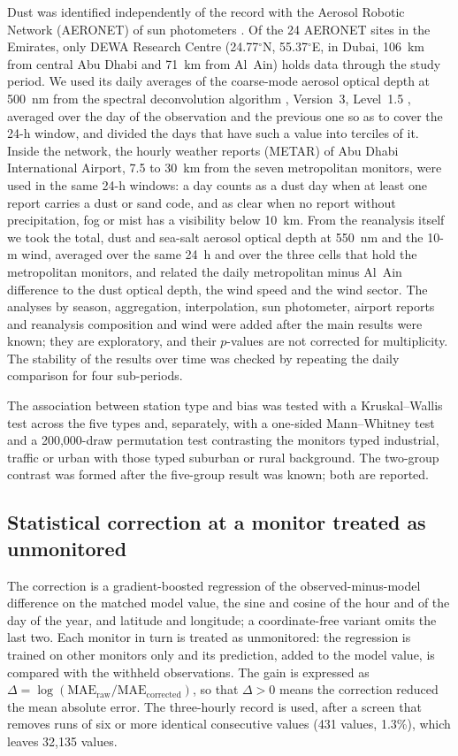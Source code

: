 Dust was identified independently of the \pmten{} record with the Aerosol Robotic Network
(AERONET) of sun photometers \citep{holben1998}. Of the 24 AERONET sites in the Emirates, only DEWA
Research Centre (24.77$^{\circ}$N, 55.37$^{\circ}$E, in Dubai, 106~km from central Abu Dhabi and
71~km from Al~Ain) holds data through the study period. We used its daily averages of the
coarse-mode aerosol optical depth at 500~nm from the spectral deconvolution algorithm
\citep{oneill2003}, Version~3, Level~1.5 \citep{giles2019}, averaged over the day of the
observation and the previous one so as to cover the 24-h window, and divided the days that have
such a value into terciles of it. Inside the network, the hourly weather reports (METAR) of Abu
Dhabi International Airport, 7.5 to 30~km from the seven metropolitan monitors, were used in the same
24-h windows: a day counts as a dust day when at least one report carries a dust or sand code, and
as clear when no report without precipitation, fog or mist has a visibility below 10~km. From the reanalysis itself we took the total, dust and
sea-salt aerosol optical depth at 550~nm and the 10-m wind, averaged over the same 24~h and over
the three cells that hold the metropolitan monitors, and related the daily metropolitan minus
Al~Ain difference to the dust optical depth, the wind speed and the wind sector. The analyses by
season, aggregation, interpolation, sun photometer, airport reports and reanalysis composition and
wind were added after the main results were known; they are exploratory, and their $p$-values are
not corrected for multiplicity. The stability of the results over time was checked by repeating the daily comparison for four sub-periods.

The association between station type and bias was tested with a Kruskal--Wallis test across the
five types \citep{kruskal1952} and, separately, with a one-sided Mann--Whitney test
\citep{mann1947} and a 200,000-draw permutation
test contrasting the monitors typed industrial, traffic or urban with those typed suburban or
rural background. The two-group contrast was formed after the five-group result was known; both
are reported.

\subsection{Statistical correction at a monitor treated as unmonitored}
\label{sec:methods-transfer}

The correction is a gradient-boosted regression \citep{friedman2001,pedregosa2011} of the
observed-minus-model difference on the matched model value, the sine and cosine of the hour and
of the day of the year, and latitude and longitude; a coordinate-free variant omits the last two.
Each monitor in turn is treated as unmonitored: the regression is trained on other monitors only
and its prediction, added to the model value, is compared with the withheld observations. The
gain is expressed as $\Delta=\log(\mathrm{MAE_{raw}}/\mathrm{MAE_{corrected}})$, so that
$\Delta>0$ means the correction reduced the mean absolute error. The three-hourly record is used,
after a screen that removes runs of six or more identical consecutive values (431 values, 1.3\%),
which leaves 32,135 values.

